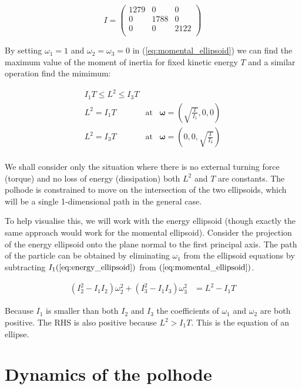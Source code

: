 \documentclass[a4paper, 12pt]{article}
\begin{document}
$$
I=
\begin{pmatrix}
  1279 & 0 & 0 \\
  0 & 1788 & 0 \\
  0 & 0 & 2122 \\
\end{pmatrix}
$$

By setting $\omega_1=1$ and $\omega_2=\omega_3=0$ in (\ref{eq:momental_ellipsoid}) we can find the maximum value of the moment of inertia for fixed kinetic energy $T$ and a similar operation find the mimimum:

\begin{eqnarray*}
  I_1T \leq L^2 \leq I_3 T \\
  L^2=I_1T & \textrm{at} & \mathbf{\omega}=(\sqrt{\frac{T}{I_1}}, 0, 0) \\
  L^2=I_3T & \textrm{at} & \mathbf{\omega}=(0, 0, \sqrt{\frac{T}{I_3}}) \\
\end{eqnarray*}

We shall consider only the situation where there is no external turning force (torque) and no loss of energy (dissipation) both $L^2$ and $T$ are constants. The polhode is constrained to move on the intersection of the two ellipsoids, which will be a single 1-dimensional path in the general case.

To help visualise this, we will work with the energy ellipsoid (though exactly the same approach would work for the momental ellipsoid). Consider the projection of the energy ellipsoid onto the plane normal to the first principal axis. The path of the particle can be obtained by eliminating $\omega_1$ from the ellipsoid equations by subtracting $I_1(\ref{eq:energy_ellipsoid})$ from $(\ref{eq:momental_ellipsoid})$.

\begin{align}
  (I_2^2 - I_1I_2)\omega_2^2 + (I_3^2-I_1I_3)\omega_3^2 & = L^2 - I_1T
\end{align}

Because $I_1$ is smaller than both $I_2$ and $I_3$ the coefficients of $\omega_1$ and $\omega_2$ are both positive. The RHS is also positive because $L^2 > I_1T$. This is the equation of an ellipse.


\section{Dynamics of the polhode}
\end{document}
